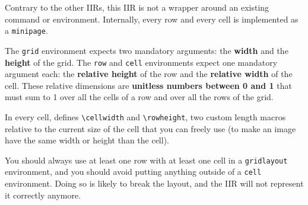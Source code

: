 \documentclass[11pt, a4paper]{article}
\begin{document}
Contrary to the other IIRs, this IIR is not a wrapper around an existing command or environment.
Internally, every row and every cell is implemented as a \texttt{minipage}.

The \texttt{grid} environment expects two mandatory arguments: the \textbf{width} and the \textbf{height} of the grid.
The \texttt{row} and \texttt{cell} environments expect one mandatory argument each: the \textbf{relative height} of the row and the \textbf{relative width} of the cell. These relative dimensions are \textbf{unitless numbers between 0 and 1} that must sum to 1 over all the cells of a row and over all the rows of the grid.

\begin{info}
    In every cell, \iLaTeX{} defines \verb|\cellwidth| and \verb|\rowheight|, two custom length macros relative to the current size of the cell that you can freely use (\eg to make an image have the same width or height than the cell).
\end{info}

\begin{warning}
    You should always use at least one row with at least one cell in a \texttt{gridlayout} environment, and you should avoid putting anything outside of a \texttt{cell} environment.
    Doing so is likely to break the layout, and the IIR will not represent it correctly anymore.
\end{warning}
\end{document}
